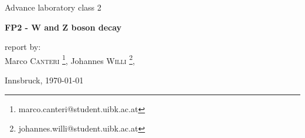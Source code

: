 \documentclass[a4paper,10pt]{article}
\begin{document}

\begin{titlepage}
 \begin{center}
	\Large{Advance laboratory class 2}
	\end{center}
	\begin{center}
	 \LARGE{\textbf{FP2 - W and Z boson decay}}
	\end{center}
	
	\begin{center}
	report by: \\
	Marco \textsc{Canteri} \footnote{marco.canteri@student.uibk.ac.at},
	Johannes \textsc{Willi} \footnote{johannes.willi@student.uibk.ac.at},
	\end{center}
	
	\begin{center}
	\vspace{1cm}
	Innsbruck, \today
	\vspace{2cm}
	\end{center}
	

\end{titlepage}
\end{document}
